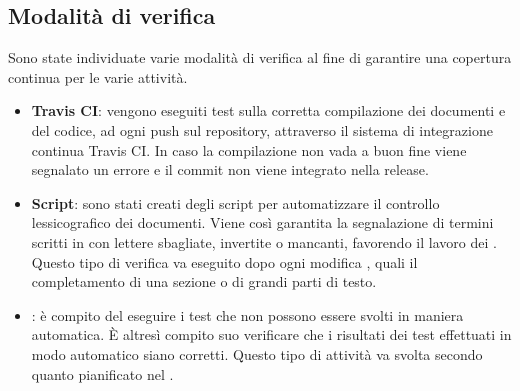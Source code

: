 \subsection{Modalità di verifica}
Sono state individuate varie modalità di verifica al fine di garantire una copertura continua per le varie attività.
\begin{itemize}
	\item \textbf{Travis CI}: vengono eseguiti test sulla corretta compilazione dei documenti e del codice, ad ogni push sul repository, attraverso il sistema di integrazione continua Travis CI. In caso la compilazione non vada a buon fine viene segnalato un errore e il commit non viene integrato nella release.
	\item \textbf{Script}: sono stati creati degli script per automatizzare il controllo lessicografico dei documenti. Viene così garantita la segnalazione di termini scritti in con lettere sbagliate, invertite o mancanti, favorendo il lavoro dei \Verificatori{}. Questo tipo di verifica va eseguito dopo ogni modifica , quali il completamento di una sezione o di grandi parti di testo.
	\item \textbf{\Verificatore{}}: è compito del \Verificatore{} eseguire i test che non possono essere svolti in maniera automatica. È altresì compito suo verificare che i risultati dei test effettuati in modo automatico siano corretti. Questo tipo di attività va svolta secondo quanto pianificato nel \PianoDiProgetto{}.
\end{itemize}
